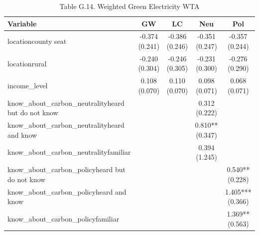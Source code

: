 \begin{table}[!htbp]
\centering
\caption{Table G.14. Weighted Green Electricity WTA}
\begin{tabular}{lcccc}
\hline
Variable & GW & LC & Neu & Pol \\
\hline
locationcounty seat & -0.374 (0.241) & -0.386 (0.246) & -0.351 (0.247) & -0.357 (0.244) \\
locationrural & -0.240 (0.304) & -0.246 (0.305) & -0.231 (0.300) & -0.276 (0.290) \\
income\_level & 0.108 (0.070) & 0.110 (0.070) & 0.098 (0.071) & 0.068 (0.071) \\
know\_about\_carbon\_neutralityheard but do not know &  &  & 0.312 (0.222) &  \\
know\_about\_carbon\_neutralityheard and know &  &  & 0.810** (0.347) &  \\
know\_about\_carbon\_neutralityfamiliar &  &  & 0.394 (1.245) &  \\
know\_about\_carbon\_policyheard but do not know &  &  &  & 0.540** (0.228) \\
know\_about\_carbon\_policyheard and know &  &  &  & 1.405*** (0.366) \\
know\_about\_carbon\_policyfamiliar &  &  &  & 1.369** (0.563) \\
\hline
\end{tabular}
\end{table}
